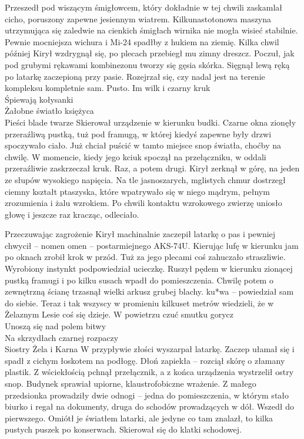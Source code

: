 \documentclass[../MAIN.tex]{subfiles}
\begin{document}
Przeszedł pod wiszącym śmigłowcem, który dokładnie w tej chwili zaskamlał cicho, poruszony zapewne jesiennym wiatrem. Kilkunastotonowa maszyna utrzymująca się zaledwie na cienkich śmigłach wirnika nie mogła wisieć stabilnie. Pewnie mocniejsza wichura i Mi-24 spadłby z hukiem na ziemię. Kilka chwil później Kirył wzdrygnął się, po plecach przebiegł mu zimny dreszcz. Poczuł, jak pod grubymi rękawami kombinezonu tworzy się gęsia skórka. Sięgnął lewą ręką po latarkę zaczepioną przy pasie. Rozejrzał się, czy nadal jest na terenie kompleksu kompletnie sam. Pusto.
\sw[12em]
Im wilk i czarny kruk\\
Śpiewają kołysanki\\
Żałobne światło księżyca\\
Pieści blade twarze
\qw
Skierował urządzenie w kierunku budki. Czarne okna zionęły przeraźliwą pustką, tuż pod framugą, w której kiedyś zapewne były drzwi spoczywało ciało. Już chciał puścić w tamto miejsce snop światła, choćby na chwilę. W momencie, kiedy jego kciuk spoczął na przełączniku, w oddali przeraźliwie zaskrzeczał kruk. Raz, a potem drugi. Kirył zerknął w górę, na jeden ze słupów wysokiego napięcia. Na tle jasnoszarych, mglistych chmur dostrzegł ciemny kształt ptaszyska, które wpatrywało się w niego mądrym, pełnym zrozumienia i żalu wzrokiem. Po chwili kontaktu wzrokowego zwierzę uniosło głowę i jeszcze raz kracząc, odleciało.

Przeczuwając zagrożenie Kirył machinalnie zaczepił latarkę o pas i pewniej chwycił – nomen omen – postarmiejnego AKS-74U. Kierując lufę w kierunku jam po oknach zrobił krok w przód. Tuż za jego plecami coś zahuczało straszliwie. Wyrobiony instynkt podpowiedział ucieczkę. Ruszył pędem w kierunku zionącej pustką framugi i po kilku susach wpadł do pomieszczenia. Chwilę potem o zewnętrzną ścianę trzasnął wielki arkusz grubej blachy. ku*wa – powiedział sam do siebie. Teraz i tak wszyscy w promieniu kilkuset metrów wiedzieli, że w Żelaznym Lesie coś się dzieje.
\sw[15em]
W powietrzu czuć smutku gorycz\\
Unoszą się nad polem bitwy\\
Na skrzydłach czarnej rozpaczy\\
Siostry Żela i Karna
\qw
W przypływie złości wyszarpał latarkę. Zaczep ułamał się i spadł z cichym łoskotem na podłogę. Dłoń zapiekła – rozciął skórę o złamany plastik. Z wściekłością pchnął przełącznik, a z końca urządzenia wystrzelił ostry snop. Budynek sprawiał upiorne, klaustrofobiczne wrażenie. Z małego przedsionka prowadziły dwie odnogi – jedna do pomieszczenia, w którym stało biurko i regał na dokumenty, druga do schodów prowadzących w dół. Wszedł do pierwszego. Omiótł je światłem latarki, ale jedyne co tam znalazł, to kilka pustych puszek po konserwach. Skierował się do klatki schodowej.
\end{document}
